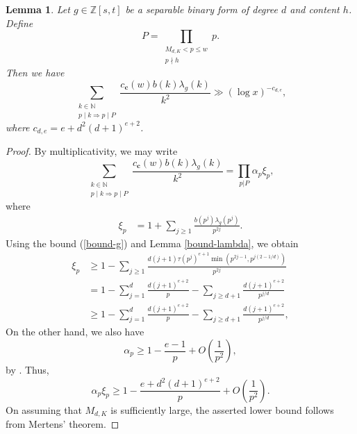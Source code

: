 \documentclass[reqno, 11pt]{amsart}
\renewcommand{\leq}{\leqslant}
\renewcommand{\geq}{\geqslant}
\newtheorem{lemma}[theorem]{Lemma}
\theoremstyle{definition}
\theoremstyle{definition}
\renewcommand{\geq}{\geqslant}
\renewcommand{\leq}{\leqslant}
\newcommand{\cc}{\mathbf{c}}
\newcommand{\ZZ}{\mathbb{Z}}
\numberwithin{equation}{section}
\begin{document}
\begin{lemma}\label{BST-L-9.4}
	Let $g \in \ZZ[s, t]$ be a separable binary form of degree $d$ and content $h$. Define
	$$P = \prod_{\substack{M_{d,K} < p \leq w \\ p \nmid h}} p.$$
	Then we have
	$$\sum_{\substack{k \in \mathbb{N} \\ p \mid k \Rightarrow p \mid P}} 
\frac{c_\cc(w) b(k) \lambda_{g}(k)}{k^2} \gg (\log x)^{-c_{d, e}}, $$
    where $c_{d, e} = e + d^2(d+1)^{e+2}$.
\end{lemma}
\begin{proof}
	By multiplicativity, we may write 
	$$\sum_{\substack{k \in \mathbb{N} \\ p \mid k \Rightarrow p \mid P}}  \frac{c_\cc(w) b(k) \lambda_{g}(k)}{k^2} = \prod_{p | P} \alpha_p \xi_p,$$
    where
    \begin{align*}
    	\xi_p & = 1 + \sum_{j \geq 1} \frac{b(p^j)\lambda_{g}(p^j)}{p^{2j}}.
    \end{align*}
Using the bound (\ref{bound-g}) and Lemma \ref{bound-lambda}, we obtain
\begin{align*}
    	\xi_p & \geq 1 - \sum_{j \geq 1} \frac{d (j+1) \tau(p^j)^{e+1} \min (p^{2j-1}, p^{j(2 - 1/d)})}{p^{2j}} \\
    	& = 1 - \sum_{j = 1}^d \frac{d(j+1)^{e+2}}{p} - \sum_{j \geq d+1} \frac{d(j+1)^{e+2}}{p^{j/d}} \\
    	& \geq 1 - \sum_{j = 1}^d \frac{d(j+1)^{e+2}}{p} - \sum_{j \geq d+1} \frac{d(j+1)^{e+2}}{p^{j/d}},
    \end{align*}
On the other hand, we also have 
$$\alpha_p \geq 1 - \frac{e-1}{p} + O \left( \frac{1}{p^2} \right),$$
by \cite[Formula (6.8)]{BST}.
Thus,
$$\alpha_p \xi_p \geq 1 - \frac{e + d^2(d+1)^{e+2}}{p} + O \left( \frac{1}{p^2} \right).$$
On assuming that $M_{d, K}$ is sufficiently large, the asserted lower bound follows from Mertens' theorem.

\end{proof}
\end{document}
